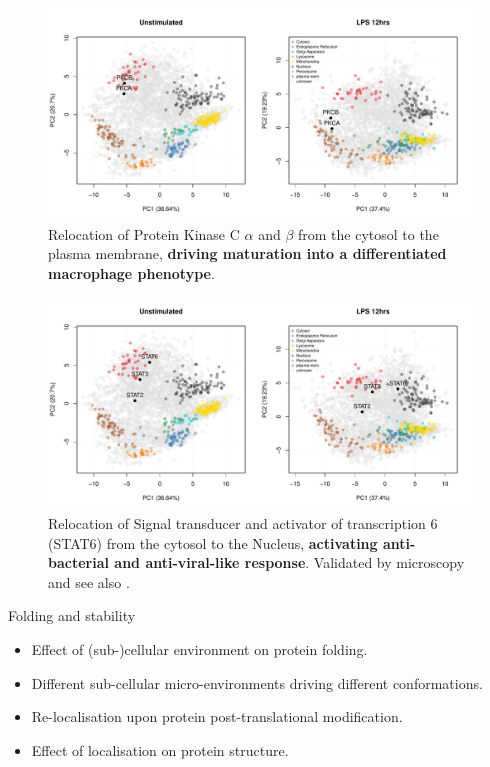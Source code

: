 \begin{frame}
  \begin{figure}[h]
    \centering
    \includegraphics[width=\linewidth]{./figs/lps-pkc.pdf}
    \caption{Relocation of Protein Kinase C $\alpha$ and $\beta$ from the
      cytosol to the plasma membrane, \textbf{driving maturation into
        a differentiated macrophage phenotype}.}
  \end{figure}
\end{frame}

\begin{frame}
  \begin{figure}[h]
    \centering
    \includegraphics[width=\linewidth]{./figs/lps-stat.pdf}
    \caption{Relocation of Signal transducer and activator of
      transcription 6 (STAT6) from the cytosol to the Nucleus,
      \textbf{activating anti-bacterial and anti-viral-like
        response}. Validated by microscopy and see also
      \cite{Chen:2011}.}
  \end{figure}
\end{frame}



\begin{frame}
  \begin{block}{Folding and stability}
    \begin{itemize}
    \item Effect of (sub-)cellular environment on protein folding.
    \item Different sub-cellular micro-environments driving
      different conformations.
    \item Re-localisation upon protein post-translational modification.
    \item Effect of localisation on protein structure.
    \end{itemize}
  \end{block}
\end{frame}
